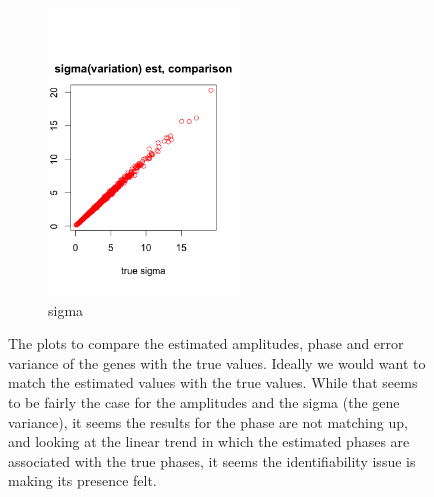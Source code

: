 \documentclass[11pt]{article}
\begin{document}
\begin{figure}[ht]
     \begin{subfigure}[t]{0.5\textwidth}
        \centering
        \includegraphics[height=3in]{../figures/cell_order_R_figs/sigma_compare.png}
        \caption{sigma}
    \end{subfigure}
    \caption{ The plots to compare the estimated amplitudes, phase and error variance of the genes with the true values. Ideally we would want to match the estimated values with the true values. While that seems to be fairly the case for the amplitudes and the sigma (the gene variance), it seems the results for the phase are not matching up, and looking at the linear trend in which the estimated phases are associated with the true phases, it seems the identifiability issue is making its presence felt.}
 \label{fig:fig1}
 \end{figure}
    
\end{document}
